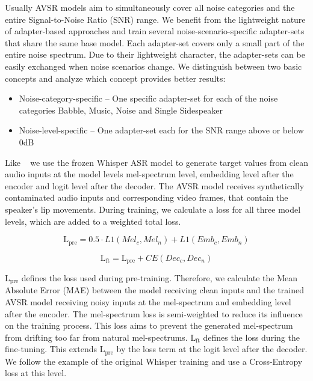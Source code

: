 Usually AVSR models aim to simultaneously cover all noise categories and the entire Signal-to-Noise Ratio (SNR) range. We benefit from the lightweight nature of adapter-based approaches and train several noise-scenario-specific adapter-sets that share the same base model. Each adapter-set covers only a small part of the entire noise spectrum.
Due to their lightweight character, the adapter-sets can be easily exchanged when noise scenarios change. We distinguish between two basic concepts and analyze which concept provides better results:
\begin{itemize}
\item Noise-category-specific -- One specific adapter-set for each of the noise categories Babble, Music, Noise and Single Sidespeaker
\item Noise-level-specific -- One adapter-set each for the SNR range above or below 0dB
\end{itemize}

Like ~\cite{AVSR_2023_selfsupervised} we use the frozen Whisper ASR model to generate target values from clean audio inputs at the model levels mel-spectrum level, embedding level after the encoder and logit level after the decoder.
The AVSR model receives synthetically contaminated audio inputs and corresponding video frames, that contain the speaker's lip movements.
During training, we calculate a loss for all three model levels, which are added to a weighted total loss. 

\begin{equation}
\text{L}_{\text{pre}} = 0.5 \cdot L1\left(Mel_c,Mel_n\right) + L1\left(Emb_c,Emb_n\right)
\end{equation}

\begin{equation}
\text{L}_{\text{ft}} = \text{L}_{\text{pre}} + CE\left(Dec_c,Dec_n\right)
\end{equation}

$\text{L}_{\text{pre}}$ defines the loss used during pre-training. Therefore, we calculate the  Mean Absolute Error (MAE) between the model receiving clean inputs and the trained AVSR model receiving noisy inputs at the mel-spectrum and embedding level after the encoder. The mel-spectrum loss is semi-weighted to reduce its influence on the training process.
This loss aims to prevent the generated mel-spectrum from drifting too far from natural mel-spectrums.
$\text{L}_{\text{ft}}$ defines the loss during the fine-tuning. This extends $\text{L}_{\text{pre}}$ by the loss term at the logit level after the decoder. We follow the example of the original Whisper training and use a Cross-Entropy loss at this level.


